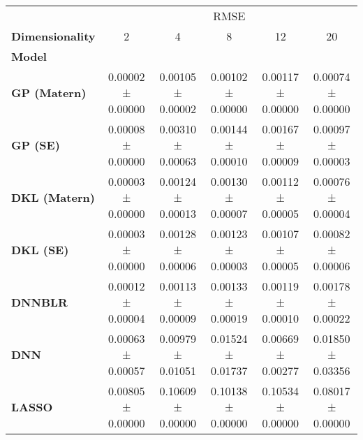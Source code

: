 \begin{tabular}{lccccc}
\toprule
{} & \multicolumn{5}{c}{RMSE} \\
\textbf{Dimensionality} &                 2  &                 4  &                 8  &                 12 &                 20 \\
\textbf{Model       } &                    &                    &                    &                    &                    \\
\midrule
\textbf{GP (Matern) } &  0.00002 ± 0.00000 &  0.00105 ± 0.00002 &  0.00102 ± 0.00000 &  0.00117 ± 0.00000 &  0.00074 ± 0.00000 \\
\textbf{GP (SE)     } &  0.00008 ± 0.00000 &  0.00310 ± 0.00063 &  0.00144 ± 0.00010 &  0.00167 ± 0.00009 &  0.00097 ± 0.00003 \\
\textbf{DKL (Matern)} &  0.00003 ± 0.00000 &  0.00124 ± 0.00013 &  0.00130 ± 0.00007 &  0.00112 ± 0.00005 &  0.00076 ± 0.00004 \\
\textbf{DKL (SE)    } &  0.00003 ± 0.00000 &  0.00128 ± 0.00006 &  0.00123 ± 0.00003 &  0.00107 ± 0.00005 &  0.00082 ± 0.00006 \\
\textbf{DNNBLR      } &  0.00012 ± 0.00004 &  0.00113 ± 0.00009 &  0.00133 ± 0.00019 &  0.00119 ± 0.00010 &  0.00178 ± 0.00022 \\
\textbf{DNN         } &  0.00063 ± 0.00057 &  0.00979 ± 0.01051 &  0.01524 ± 0.01737 &  0.00669 ± 0.00277 &  0.01850 ± 0.03356 \\
\textbf{LASSO       } &  0.00805 ± 0.00000 &  0.10609 ± 0.00000 &  0.10138 ± 0.00000 &  0.10534 ± 0.00000 &  0.08017 ± 0.00000 \\
\bottomrule
\end{tabular}
